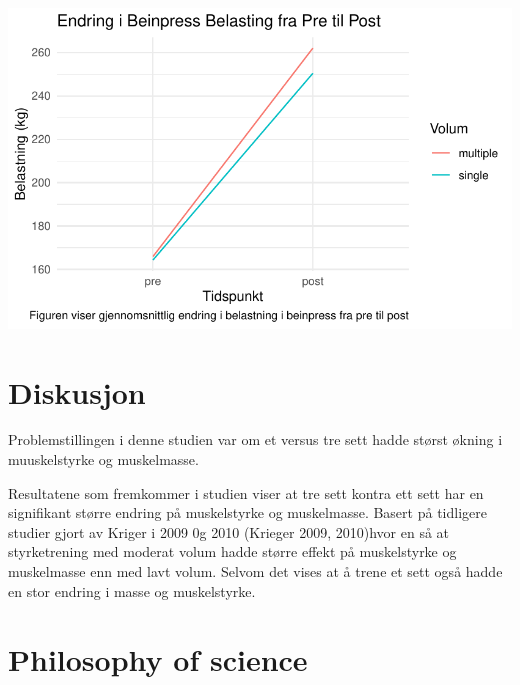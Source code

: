 \documentclass[
  letterpaper,
  DIV=11,
  numbers=noendperiod]{scrreprt}
\begin{document}
\includegraphics{05-repeated-measurements_files/figure-pdf/unnamed-chunk-5-1.pdf}


\chapter{Diskusjon}\label{diskusjon-4}

Problemstillingen i denne studien var om et versus tre sett hadde størst
økning i muuskelstyrke og muskelmasse.

Resultatene som fremkommer i studien viser at tre sett kontra ett sett
har en signifikant større endring på muskelstyrke og muskelmasse. Basert
på tidligere studier gjort av Kriger i 2009 0g 2010 (Krieger 2009,
2010)hvor en så at styrketrening med moderat volum hadde større effekt
på muskelstyrke og muskelmasse enn med lavt volum. Selvom det vises at å
trene et sett også hadde en stor endring i masse og muskelstyrke.


\chapter{Philosophy of science}\label{philosophy-of-science}
\end{document}
